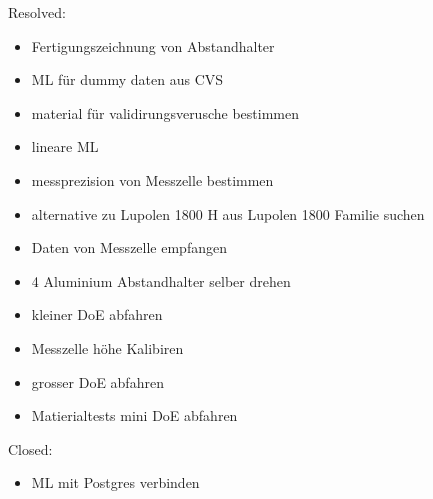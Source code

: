 Resolved:
\begin{itemize}
\item Fertigungszeichnung von Abstandhalter
\item ML für dummy daten aus CVS
\item material für validirungsverusche bestimmen
 \item lineare ML
 \item messprezision von Messzelle bestimmen
 \item alternative zu Lupolen 1800 H aus Lupolen 1800 Familie suchen
 \item Daten von Messzelle empfangen
 \item 4 Aluminium Abstandhalter selber drehen
 \item kleiner DoE abfahren
   \item Messzelle höhe Kalibiren
   \item grosser DoE abfahren
     \item Matierialtests mini DoE abfahren
 
\end{itemize}

Closed:
\begin{itemize}
\item ML mit Postgres verbinden
 
\end{itemize}
